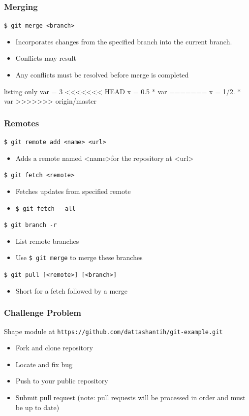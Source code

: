 \documentclass[english,compress]{beamer}
\begin{document}
\begin{frame}[fragile]
    \frametitle{Merging}

    \verb|$ git merge <branch>|
    \begin{itemize}
        \item Incorporates changes from the specified branch into the current
            branch.
        \item Conflicts may result
        \item Any conflicts must be resolved before merge is completed
    \end{itemize}

    \begin{tcblisting}{listing only}
var = 3
<<<<<<< HEAD
x = 0.5 * var
=======
x = 1/2. * var
>>>>>>> origin/master
    \end{tcblisting}
\end{frame}

\begin{frame}[fragile]
    \frametitle{Remotes}

    \verb|$ git remote add <name> <url>|
    \begin{itemize}
        \item Adds a remote named \textless name\textgreater for the repository at \textless url\textgreater
    \end{itemize}

    \verb|$ git fetch <remote>|
    \begin{itemize}
        \item Fetches updates from specified remote
        \item \verb|$ git fetch --all|
    \end{itemize}

    \verb|$ git branch -r |
    \begin{itemize}
        \item List remote branches
        \item Use \verb|$ git merge| to merge these branches
    \end{itemize}

    \verb|$ git pull [<remote>] [<branch>]|
    \begin{itemize}
        \item Short for a fetch followed by a merge
    \end{itemize}
\end{frame}

\begin{frame}[fragile]
    \frametitle{Challenge Problem}

    Shape module at \verb|https://github.com/dattashantih/git-example.git|
    \begin{itemize}
        \item Fork and clone repository
        \item Locate and fix bug
        \item Push to your public repository
        \item Submit pull request (note: pull requests will be processed in 
            order and must be up to date)
    \end{itemize}
\end{frame}
\end{document}
